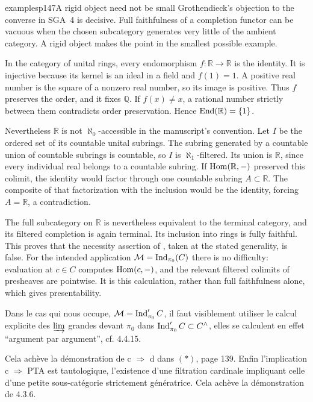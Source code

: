 \begin{dcomment}{examples}{p147}{A rigid object need not be small}
Grothendieck's objection to the converse in SGA~4 is decisive. Full faithfulness of a completion functor can be vacuous when the chosen subcategory generates very little of the ambient category. A rigid object makes the point in the smallest possible example.

In the category of unital rings, every endomorphism $f:\mathbb R\to\mathbb R$ is the identity. It is injective because its kernel is an ideal in a field and $f(1)=1$. A positive real number is the square of a nonzero real number, so its image is positive. Thus $f$ preserves the order, and it fixes $\mathbb Q$. If $f(x)\neq x$, a rational number strictly between them contradicts order preservation. Hence $\operatorname{End}(\mathbb R)=\{1\}$.

Nevertheless $\mathbb R$ is not $\aleph_0$-accessible in the manuscript's convention. Let $I$ be the ordered set of its countable unital subrings. The subring generated by a countable union of countable subrings is countable, so $I$ is $\aleph_1$-filtered. Its union is $\mathbb R$, since every individual real belongs to a countable subring. If $\operatorname{Hom}(\mathbb R,-)$ preserved this colimit, the identity would factor through one countable subring $A\subset\mathbb R$. The composite of that factorization with the inclusion would be the identity, forcing $A=\mathbb R$, a contradiction.

The full subcategory on $\mathbb R$ is nevertheless equivalent to the terminal category, and its filtered completion is again terminal. Its inclusion into rings is fully faithful. This proves that the necessity assertion of \citet[Expos\'e~I, Corollary~9.18(a)]{SGA4I1972}, taken at the stated generality, is false. For the intended application $\mathcal M=\operatorname{Ind}_{\pi_0}(C)$ there is no difficulty: evaluation at $c\in C$ computes $\operatorname{Hom}(c,-)$, and the relevant filtered colimits of presheaves are pointwise. It is this calculation, rather than full faithfulness alone, which gives presentability.
\end{dcomment}


Dans le cas qui nous occupe, $\mathcal{M}=\operatorname{Ind}'_{\pi_0}C$, il faut visiblement utiliser le calcul explicite des $\varinjlim$ grandes devant $\pi_0$ dans $\operatorname{Ind}'_{\pi_0}C\subset C^{\wedge}$, elles se calculent en effet “argument par argument”, cf. 4.4.15.

Cela achève la démonstration de c $\Longrightarrow$ d dans $(*)$, page 139. Enfin l'implication c $\Longrightarrow$ PTA est tautologique, l'existence d'une filtration cardinale impliquant celle d'une petite sous-catégorie strictement génératrice. Cela achève la démonstration de 4.3.6.

